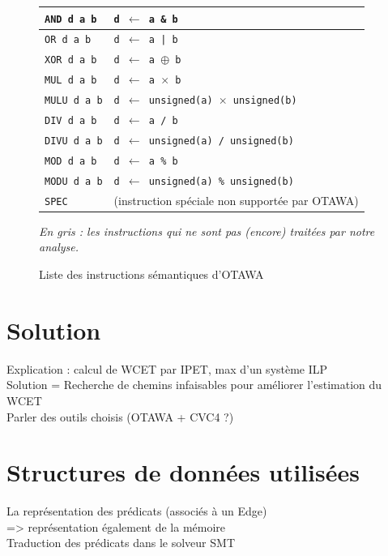\documentclass[french]{article}
\begin{document}
\begin{figure}
\begin{tabular}{|l|l|}
      \rowcolor{Gray} \texttt{AND d a b} & \texttt{d $\leftarrow$ a \& b}\\ \hline
      \rowcolor{Gray} \texttt{OR d a b} & \texttt{d $\leftarrow$ a | b}\\ \hline
      \rowcolor{Gray} \texttt{XOR d a b} & \texttt{d $\leftarrow$ a $\oplus$ b}\\ \hline
      \texttt{MUL d a b} & \texttt{d $\leftarrow$ a $\times$ b}\\ \hline
      \rowcolor{Gray} \texttt{MULU d a b} & \texttt{d $\leftarrow$ unsigned(a) $\times$ unsigned(b)}\\ \hline
      \texttt{DIV d a b} & \texttt{d $\leftarrow$ a / b}\\ \hline
      \rowcolor{Gray} \texttt{DIVU d a b} & \texttt{d $\leftarrow$ unsigned(a) / unsigned(b)}\\ \hline
      \texttt{MOD d a b} & \texttt{d $\leftarrow$ a \% b}\\ \hline
      \rowcolor{Gray} \texttt{MODU d a b} & \texttt{d $\leftarrow$ unsigned(a) \% unsigned(b)}\\ \hline
      \rowcolor{Gray} \texttt{SPEC} & (instruction spéciale non supportée par OTAWA)\\ \hline
    \end{tabular}
    \textit{En gris : les instructions qui ne sont pas (encore) traitées par notre analyse.}
    \caption{Liste des instructions sémantiques d'OTAWA}
  \end{figure}


  \section{Solution}
  Explication : calcul de WCET par IPET, max d'un système ILP\\
  Solution = Recherche de chemins infaisables pour améliorer l'estimation du WCET\\
  Parler des outils choisis (OTAWA + CVC4 ?)\\

  \section{Structures de données utilisées}
  La représentation des prédicats (associés à un Edge)\\
  => représentation également de la mémoire\\
  Traduction des prédicats dans le solveur SMT
\end{document}
